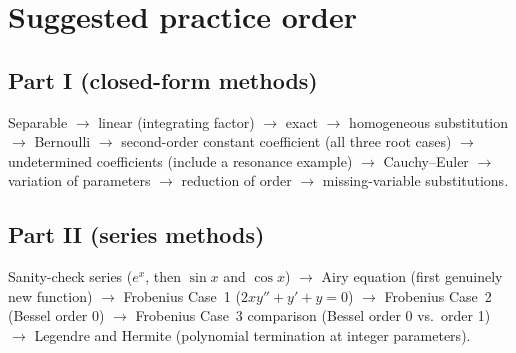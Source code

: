 \documentclass{essay}
\begin{document}
\section{Suggested practice order}

\subsection*{Part I (closed-form methods)}

Separable \(\to\) linear (integrating factor) \(\to\) exact \(\to\) homogeneous substitution \(\to\) Bernoulli \(\to\) second-order constant coefficient (all three root cases) \(\to\) undetermined coefficients (include a resonance example) \(\to\) Cauchy--Euler \(\to\) variation of parameters \(\to\) reduction of order \(\to\) missing-variable substitutions.

\subsection*{Part II (series methods)}

Sanity-check series (\(e^{x}\), then \(\sin x\) and \(\cos x\)) \(\to\) Airy equation (first genuinely new function) \(\to\) Frobenius Case~1 (\(2xy'' + y' + y = 0\)) \(\to\) Frobenius Case~2 (Bessel order 0) \(\to\) Frobenius Case~3 comparison (Bessel order 0 vs.\ order 1) \(\to\) Legendre and Hermite (polynomial termination at integer parameters).
\end{document}
